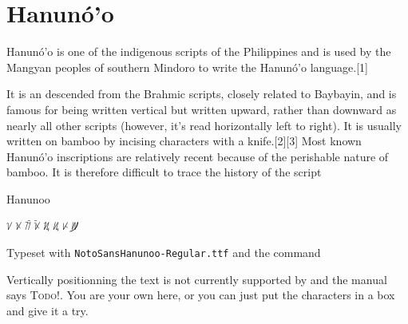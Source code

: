 \newfontfamily{}

\section{Hanunó’o}

Hanunó’o is one of the indigenous scripts of the Philippines and is used by the Mangyan peoples of southern Mindoro to write the Hanunó'o language.[1] 

It is an  descended from the Brahmic scripts, closely related to Baybayin, and is famous for being written vertical but written upward, rather than downward as nearly all other scripts (however, it's read horizontally left to right). It is usually written on bamboo by incising characters with a knife.[2][3] Most known Hanunó'o inscriptions are relatively recent because of the perishable nature of bamboo. It is therefore difficult to trace the history of the script



\begin{scriptexample}[width=2cm]{Hanunoo}
\hanunoo

{\Large
\obeylines
ᜠ 
ᜫ
ᜨᜲ
ᜫᜲ
ᜰ
ᜮ
ᜥ
ᜦ᜴}

Typeset with \texttt{NotoSansHanunoo-Regular.ttf} and the command \cmd{\hanunoo}
\end{scriptexample}

Vertically positionning the text is not currently supported by  and the manual says \textsc{Todo!}. You are your own here, or you can just put the characters in a box and give it a try.

